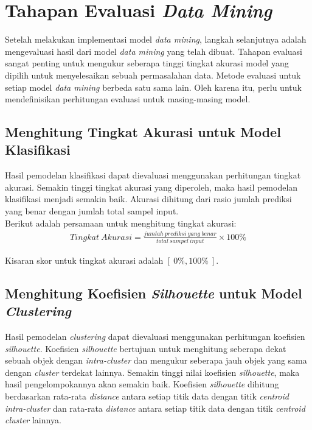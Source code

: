 \section{Tahapan Evaluasi \textit{Data Mining}}
Setelah melakukan implementasi model {\it data mining}, langkah selanjutnya adalah mengevaluasi hasil dari model {\it data mining} yang telah dibuat. Tahapan evaluasi sangat penting untuk mengukur seberapa tinggi tingkat akurasi model yang dipilih untuk menyelesaikan sebuah permasalahan data. Metode evaluasi untuk setiap model {\it data mining} berbeda satu sama lain. Oleh karena itu, perlu untuk mendefinisikan perhitungan evaluasi untuk masing-masing model. 

\subsection{Menghitung Tingkat Akurasi untuk Model Klasifikasi}
Hasil pemodelan klasifikasi dapat dievaluasi menggunakan perhitungan tingkat akurasi. Semakin tinggi tingkat akurasi yang diperoleh, maka hasil pemodelan klasifikasi menjadi semakin baik. Akurasi dihitung dari rasio jumlah prediksi yang benar dengan jumlah total sampel input. \\

\noindent Berikut adalah persamaan untuk menghitung tingkat akurasi:
\begin{align}
Tingkat\:Akurasi = \frac{jumlah\:prediksi\:yang\:benar}{total\:sampel\:input} \times 100\%
\end{align}

\noindent Kisaran skor untuk tingkat akurasi adalah $[\:0\%,100\%\:]$.

\subsection{Menghitung Koefisien \textit{Silhouette} untuk Model \textit{Clustering}}
Hasil pemodelan {\it clustering} dapat dievaluasi menggunakan perhitungan koefisien {\it silhouette}. Koefisien {\it silhouette} bertujuan untuk menghitung seberapa dekat sebuah objek dengan {\it intra-cluster} dan mengukur seberapa jauh objek yang sama dengan {\it cluster} terdekat lainnya. Semakin tinggi nilai koefisien {\it silhouette}, maka hasil pengelompokannya akan semakin baik. Koefisien {\it silhouette} dihitung berdasarkan rata-rata {\it distance} antara setiap titik data dengan titik {\it centroid intra-cluster} dan  rata-rata {\it distance} antara setiap titik data dengan titik {\it centroid cluster} lainnya.\\


